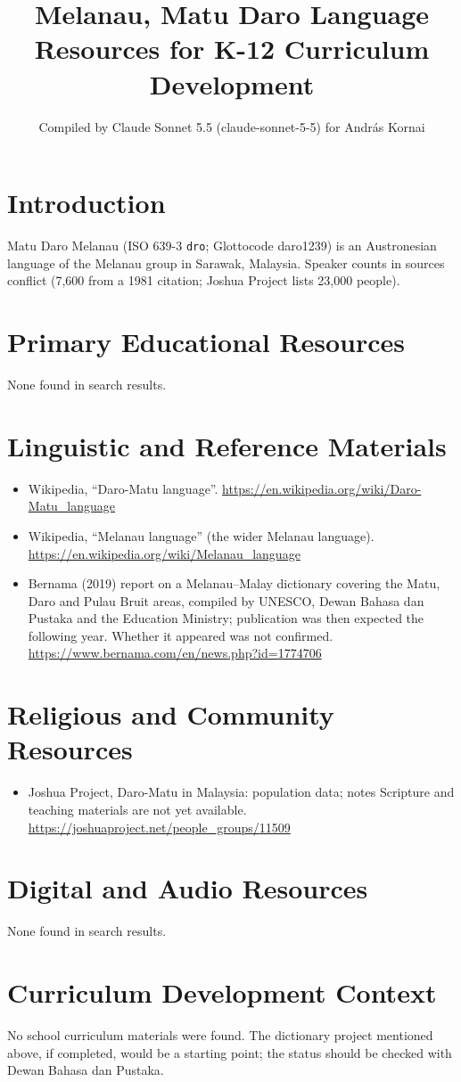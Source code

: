 \documentclass[12pt]{article}
\title{Melanau, Matu Daro Language Resources for K-12 Curriculum Development}
\author{Compiled by Claude Sonnet 5.5 (claude-sonnet-5-5) for Andr\'as Kornai}
\date{}
\begin{document}
\maketitle
\section{Introduction}
Matu Daro Melanau (ISO 639-3 \texttt{dro}; Glottocode daro1239) is an Austronesian language of the Melanau group in Sarawak, Malaysia. Speaker counts in sources conflict (7,600 from a 1981 citation; Joshua Project lists 23,000 people).
\section{Primary Educational Resources}
None found in search results.
\section{Linguistic and Reference Materials}
\begin{itemize}
\item Wikipedia, ``Daro-Matu language''. \url{https://en.wikipedia.org/wiki/Daro-Matu_language}
\item Wikipedia, ``Melanau language'' (the wider Melanau language). \url{https://en.wikipedia.org/wiki/Melanau_language}
\item Bernama (2019) report on a Melanau--Malay dictionary covering the Matu, Daro and Pulau Bruit areas, compiled by UNESCO, Dewan Bahasa dan Pustaka and the Education Ministry; publication was then expected the following year. Whether it appeared was not confirmed. \url{https://www.bernama.com/en/news.php?id=1774706}
\end{itemize}
\section{Religious and Community Resources}
\begin{itemize}
\item Joshua Project, Daro-Matu in Malaysia: population data; notes Scripture and teaching materials are not yet available. \url{https://joshuaproject.net/people_groups/11509}
\end{itemize}
\section{Digital and Audio Resources}
None found in search results.
\section{Curriculum Development Context}
No school curriculum materials were found. The dictionary project mentioned above, if completed, would be a starting point; the status should be checked with Dewan Bahasa dan Pustaka.
\end{document}
